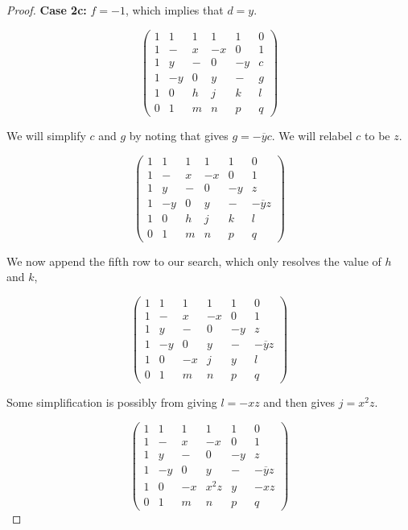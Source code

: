 \begin{lemma}
\begin{proof}
{\bf Case 2c:} $f = -1$, which implies that $d = y$.

\begin{equation}  \label{mat:2c-1}
\left(\begin{array}{rrrrrr}
 1 &  1 & 1 & 1 & 1 & 0 \\
 1 &  - & x & -x & 0 & 1 \\
 1 &  y & - & 0 & -y & c \\
 1 &  -y & 0 & y & - & g \\ \hline
 1 &  0 & h & j & k & l \\
 0 &  1 & m & n & p & q
\end{array}\right)
\end{equation}

We will simplify $c$ and $g$ by noting that  gives $g = -\overline{y}c$. We will relabel $c$ to be $z$.

\begin{equation}  \label{mat:2c-2}
\left(\begin{array}{rrrrrr}
 1 &  1 & 1 & 1 & 1 & 0 \\
 1 &  - & x & -x & 0 & 1 \\
 1 &  y & - & 0 & -y & z \\
 1 &  -y & 0 & y & - & -\overline{y}z \\ \hline
 1 &  0 & h & j & k & l \\
 0 &  1 & m & n & p & q
\end{array}\right)
\end{equation}

We now append the fifth row to our search, which only resolves the value of $h$ and $k$,

\begin{equation}  \label{mat:2c-3}
\left(\begin{array}{rrrrrr}
 1 &  1 & 1 & 1 & 1 & 0 \\
 1 &  - & x & -x & 0 & 1 \\
 1 &  y & - & 0 & -y & z \\
 1 &  -y & 0 & y & - & -\overline{y}z \\
 1 &  0 & -x & j & y & l \\ \hline
 0 &  1 & m & n & p & q
\end{array}\right)
\end{equation}

Some simplification is possibly from  giving $l = -xz$ and then  gives $j = x^2z$.

\begin{equation}  \label{mat:2c-4}
\left(\begin{array}{rrrrrr}
 1 &  1 & 1 & 1 & 1 & 0 \\
 1 &  - & x & -x & 0 & 1 \\
 1 &  y & - & 0 & -y & z \\
 1 &  -y & 0 & y & - & -\overline{y}z \\
 1 &  0 & -x & x^2z & y & -xz \\ \hline
 0 &  1 & m & n & p & q
\end{array}\right)
\end{equation}


\end{proof}
\end{lemma}

